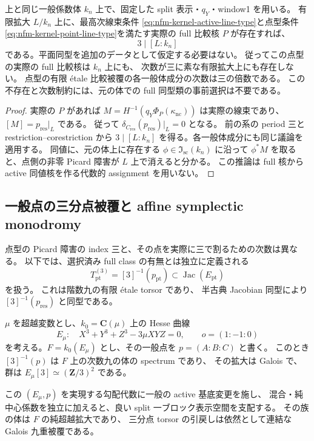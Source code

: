 \begin{corollary}[点型比較被覆の次数の三整除性]
\label{cor:nfm-point-comparison-cover-three-divisibility}
上と同じ一般係数体 $k_n$ 上で、固定した split 表示・$q_Y$・window1 を用いる。
有限拡大 $L/k_n$ 上に、最高次線束条件
\eqref{eq:nfm-kernel-active-line-type}と点型条件
\eqref{eq:nfm-kernel-point-line-type}を満たす実際の full 比較核 $P$ が存在すれば、
\[
 3\mid[L:k_n]
\]
である。平面同型を追加のデータとして仮定する必要はない。
従ってこの点型の実際の full 比較核は $k_n$ 上にも、
次数が三に素な有限拡大上にも存在しない。
点型の有限 \'etale 比較被覆の各一般体成分の次数は三の倍数である。
この不存在と次数制約には、元の体での full 同型類の事前選択は不要である。
\end{corollary}

\begin{proof}
実際の $P$ があれば
$M=H^{-1}(q_Y\Phi_P(\kappa_{\mathrm{nc}}))$ は実際の線束であり、
$[M]=p_{\mathrm{res}}|_L$ である。
従って $\delta_{C_{\mathrm{res}}}(p_{\mathrm{res}})|_L=0$ となる。
前の系の period 三と restriction--corestriction から
$3\mid[L:k_n]$ を得る。各一般体成分にも同じ議論を適用する。
同値に、元の体上に存在する $\phi\in\mathfrak I_{\mathrm{sc}}(k_n)$ に沿って
$\phi^*M$ を取ると、点側の非零 Picard 障害が $L$ 上で消えると分かる。
この推論は full 核から active 同値核を作る代数的 assignment を用いない。
\end{proof}





\subsection{一般点の三分点被覆と affine symplectic monodromy}

点型の Picard 障害の index 三と、その点を実際に三で割るための次数は異なる。
以下では、選択済み full class の有無とは独立に定義される
\[
 T_{\mathrm{pt}}^{(3)}=[3]^{-1}(p_{\mathrm{pt}})
  \subset\operatorname{Jac}(E_{\mathrm{pt}})
\]
を扱う。
これは階数九の有限 \'etale torsor であり、
半古典 Jacobian 同型により $[3]^{-1}(p_{\mathrm{res}})$ と同型である。

\begin{lemma}
\label{lem:nfm-generic-hesse-third-division}
$\mu$ を超越変数とし、$k_0=\mathbf C(\mu)$ 上の Hesse 曲線
\[
 E_\mu:\quad X^3+Y^3+Z^3-3\mu XYZ=0,
 \qquad o=(1:-1:0)
\]
を考える。$F=k_0(E_\mu)$ とし、その一般点を $p=(A:B:C)$ と書く。
このとき $[3]^{-1}(p)$ は $F$ 上の次数九の体の spectrum であり、
その拡大は Galois で、群は $E_\mu[3]\simeq(\mathbf Z/3)^2$ である。

この $(E_\mu,p)$ を実現する勾配代数に一般の active 基底変更を施し、
混合・純中心係数を独立に加えると、良い split 一ブロック表示空間を支配する。
その族の体は $F$ の純超越拡大であり、
三分点 torsor の引戻しは依然として連結な Galois 九重被覆である。
\end{lemma}

